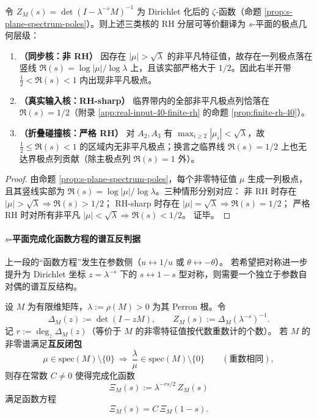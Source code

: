 \begin{corollary}\label{cor:rh-stratification-splane}
令 \(Z_M(s)=\det(I-\lambda^{-s}M)^{-1}\) 为 Dirichlet 化后的 \(\zeta\)-函数（命题 \ref{prop:s-plane-spectrum-poles}）。则上述三类核的 RH 分层可等价翻译为 \(s\)-平面的极点几何层级：
\begin{enumerate}
  \item \textbf{（同步核：非 RH）} 因存在 \(|\mu|>\sqrt{\lambda}\) 的非平凡特征值，故存在一列极点落在竖线
  \(
  \Re(s)=\log|\mu|/\log\lambda
  \)
  上，且该实部严格大于 \(1/2\)。因此右半开带 \(\tfrac12<\Re(s)<1\) 内出现非平凡极点。
  \item \textbf{（真实输入核：RH-sharp）} 临界带内的全部非平凡极点列恰落在 \(\Re(s)=1/2\)（附录 \ref{app:real-input-40-finite-rh} 的命题 \ref{prop:finite-rh-40}）。
  \item \textbf{（折叠碰撞核：严格 RH）} 对 \(A_2,A_3\) 有 \(\max_{i\ge 2}|\mu_i|<\sqrt{\lambda}\)，故 \(\tfrac12\le \Re(s)<1\) 的区域内无非平凡极点；换言之临界线 \(\Re(s)=1/2\) 上也无达界极点列贡献（除主极点列 \(\Re(s)=1\) 外）。
\end{enumerate}
\end{corollary}
\begin{proof}
由命题 \ref{prop:s-plane-spectrum-poles}，每个非零特征值 \(\mu\) 生成一列极点，且其竖线实部为 \(\Re(s)=\log|\mu|/\log\lambda\)。三种情形分别对应：
非 RH 时存在 \(|\mu|>\sqrt{\lambda}\Rightarrow \Re(s)>1/2\)；
RH-sharp 时存在 \(|\mu|=\sqrt{\lambda}\Rightarrow \Re(s)=1/2\)；
严格 RH 时对所有非平凡 \(|\mu|<\sqrt{\lambda}\Rightarrow \Re(s)<1/2\)。
证毕。
\end{proof}

\paragraph{\texorpdfstring{$s$}{s}-平面完成化函数方程的谱互反判据}\label{par:s-plane-functional-eq-criterion}
上一段的“函数方程”发生在参数侧（$u\leftrightarrow 1/u$ 或 $\theta\leftrightarrow-\theta$）。
若希望把对称进一步提升为 Dirichlet 坐标 $z=\lambda^{-s}$ 下的
\(
s\leftrightarrow 1-s
\)
型对称，则需要一个独立于参数自对偶的谱互反结构。

\begin{remark}\label{prop:reciprocal-spectrum-functional-equation}
设 $M$ 为有限维矩阵，$\lambda:=\rho(M)>0$ 为其 Perron 根。令
\[
\Delta_M(z):=\det(I-zM),\qquad
Z_M(s):=\Delta_M(\lambda^{-s})^{-1}.
\]
记 $r:=\deg_z\Delta_M(z)$（等价于 $M$ 的非零特征值按代数重数计的个数）。
若 $M$ 的非零谱满足\textbf{互反闭包}
\[
\mu\in\mathrm{spec}(M)\setminus\{0\}
\ \Longrightarrow\
\frac{\lambda}{\mu}\in\mathrm{spec}(M)\setminus\{0\}
\qquad(\text{重数相同}),
\]
则存在常数 $C\neq 0$ 使得完成化函数
\[
\Xi_M(s):=\lambda^{-rs/2}\,Z_M(s)
\]
满足函数方程
\[
\Xi_M(s)=C\,\Xi_M(1-s).
\]
\end{remark}


